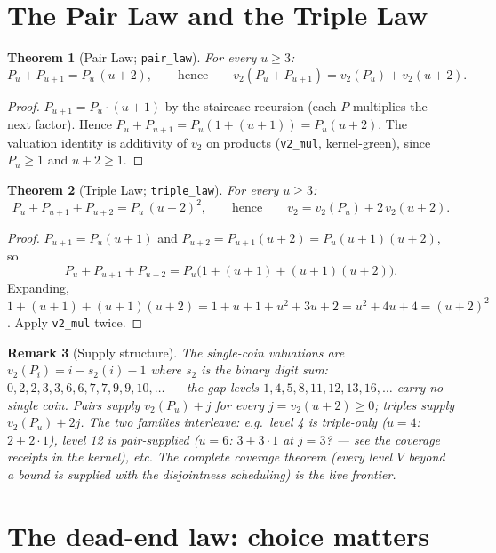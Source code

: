 \documentclass[11pt]{article}
\newtheorem{theorem}{Theorem}
\newtheorem{remark}[theorem]{Remark}
\begin{document}
\section{The Pair Law and the Triple Law}

\begin{theorem}[Pair Law; \texttt{pair\_law}]\label{thm:pair}
For every $u\ge 3$:
\[
P_u + P_{u+1} = P_u\,(u+2),
\qquad\text{hence}\qquad
v_2(P_u+P_{u+1}) = v_2(P_u) + v_2(u+2).
\]
\end{theorem}

\begin{proof}
$P_{u+1} = P_u\cdot(u+1)$ by the staircase recursion (each $P$ multiplies
the next factor). Hence
$P_u + P_{u+1} = P_u(1+(u+1)) = P_u(u+2)$.
The valuation identity is additivity of $v_2$ on products
(\texttt{v2\_mul}, kernel-green), since $P_u\ge 1$ and $u+2\ge 1$.
\end{proof}

\begin{theorem}[Triple Law; \texttt{triple\_law}]\label{thm:triple}
For every $u\ge 3$:
\[
P_u+P_{u+1}+P_{u+2} = P_u\,(u+2)^2,
\qquad\text{hence}\qquad
v_2 = v_2(P_u) + 2\,v_2(u+2).
\]
\end{theorem}

\begin{proof}
$P_{u+1} = P_u(u+1)$ and $P_{u+2} = P_{u+1}(u+2) = P_u(u+1)(u+2)$, so
\[
P_u+P_{u+1}+P_{u+2} = P_u\bigl(1+(u+1)+(u+1)(u+2)\bigr).
\]
Expanding, $1+(u+1)+(u+1)(u+2) = 1+u+1+u^2+3u+2 = u^2+4u+4 = (u+2)^2$.
Apply \texttt{v2\_mul} twice.
\end{proof}

\begin{remark}[Supply structure]
The single-coin valuations are $v_2(P_i) = i - s_2(i) - 1$ where $s_2$ is
the binary digit sum: $0,2,2,3,3,6,6,7,7,9,9,10,\dots$ --- the
\emph{gap levels} $1,4,5,8,11,12,13,16,\dots$ carry no single coin. Pairs
supply $v_2(P_u)+j$ for every $j=v_2(u+2)\ge 0$; triples supply
$v_2(P_u)+2j$. The two families interleave: e.g.\ level 4 is triple-only
($u=4$: $2+2\cdot 1$), level 12 is pair-supplied ($u=6$: $3+3\cdot 1$ at
$j=3$? --- see the coverage receipts in the kernel), etc. The complete
coverage theorem (every level $V$ beyond a bound is supplied with the
disjointness scheduling) is the live frontier.
\end{remark}

\section{The dead-end law: choice matters}
\end{document}
